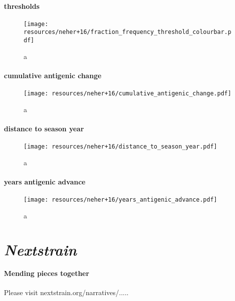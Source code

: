 \documentclass{beamer}
\begin{document}
\begin{darkframes}
    \begin{frame}{\subsecname}
      \framesubtitle{thresholds}
      \begin{figure}
        \texttt{[image: resources/neher+16/fraction\_frequency\_threshold\_colourbar.pdf]}
        \caption{\footnotesize a}
      \end{figure}
    \end{frame}

    \begin{frame}{\subsecname}
      \framesubtitle{cumulative antigenic change}
      \begin{figure}
        \texttt{[image: resources/neher+16/cumulative\_antigenic\_change.pdf]}
        \caption{\footnotesize a}
      \end{figure}
    \end{frame}

    \begin{frame}{\subsecname}
      \framesubtitle{distance to season year}
      \begin{figure}
        \texttt{[image: resources/neher+16/distance\_to\_season\_year.pdf]}
        \caption{\footnotesize a}
      \end{figure}
    \end{frame}


    \begin{frame}{\subsecname}
      \framesubtitle{years antigenic advance}
      \begin{figure}
        \texttt{[image: resources/neher+16/years\_antigenic\_advance.pdf]}
        \caption{\footnotesize a}
      \end{figure}
    \end{frame}









  \section{\textit{Nextstrain}}

    \begin{frame}{\secname}
      \framesubtitle{Mending pieces together}
      Please visit nextstrain.org/narratives/.....


\end{frame}
\end{darkframes}
\end{document}
